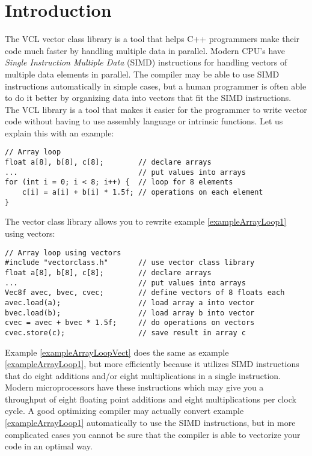 \documentclass[vcl_manual.tex]{subfiles}
\begin{document}
\chapter{Introduction}\label{chap:Introduction}
\flushleft
The VCL vector class library is a tool that helps C++ programmers make their code much faster by handling multiple data in parallel. Modern CPU’s have \textit{Single Instruction Multiple Data} (SIMD) instructions for handling vectors of multiple data elements in parallel. The compiler may be able to use SIMD instructions automatically in simple cases, but a human programmer is often able to do it better by organizing data into vectors that fit the SIMD instructions. The VCL library is a tool that makes it easier for the programmer to write vector code without having to use assembly language or intrinsic functions. Let us explain this with an example:

\begin{example}
\label{exampleArrayLoop1}
\end{example} %
\begin{lstlisting}[frame=single]
// Array loop
float a[8], b[8], c[8];        // declare arrays
...                            // put values into arrays
for (int i = 0; i < 8; i++) {  // loop for 8 elements
    c[i] = a[i] + b[i] * 1.5f; // operations on each element
}
\end{lstlisting}

The vector class library allows you to rewrite example \ref{exampleArrayLoop1} using vectors:

\begin{example}
\label{exampleArrayLoopVect}
\end{example}
\begin{lstlisting}[frame=single]
// Array loop using vectors
#include "vectorclass.h"       // use vector class library
float a[8], b[8], c[8];        // declare arrays
...                            // put values into arrays
Vec8f avec, bvec, cvec;        // define vectors of 8 floats each
avec.load(a);                  // load array a into vector
bvec.load(b);                  // load array b into vector
cvec = avec + bvec * 1.5f;     // do operations on vectors
cvec.store(c);                 // save result in array c
\end{lstlisting}

Example \ref{exampleArrayLoopVect} does the same as example \ref{exampleArrayLoop1}, but more efficiently because it utilizes SIMD instructions that do eight additions and/or eight multiplications in a single instruction. Modern microprocessors have these instructions which may give you a throughput of eight floating point additions and eight multiplications per clock cycle. A good optimizing compiler may actually convert example \ref{exampleArrayLoop1} automatically to use the SIMD instructions, but in more complicated cases you cannot be sure that the compiler is able to vectorize your code in an optimal way.
\end{document}
